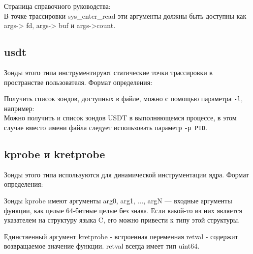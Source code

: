 \noindent Страница справочного руководства: \\
В точке трассировки sys\_enter\_read эти аргументы должны быть доступны как
args-> fd, args-> buf и args->count. \\


\subsection{usdt}
Зонды этого типа инструментируют статические точки трассировки в пространстве
пользователя. Формат определения: \\

\noindent Получить список зондов, доступных в файле, можно с помощью параметра \texttt{-l}, например: \\
Можно получить и список зондов USDT в выполняющемся процессе, в этом случае
вместо имени файла следует использовать параметр \texttt{-p PID}.

\subsection{kprobe и kretprobe}
Зонды этого типа используются для динамической инструментации ядра. Формат
определения: \\

Зонды kprobe имеют аргументы arg0, arg1, ..., argN — входные аргументы функции,
как целые 64-битные целые без знака. Если какой-то из них является указателем
на структуру языка C, его можно привести к типу этой структуры.

Единственный аргумент kretprobe - встроенная переменная retval - содержит 
возвращаемое значение функции. retval всегда имеет тип uint64.

